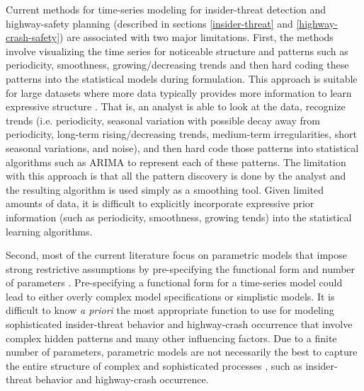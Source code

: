 \documentclass[letterpaper]{article}
\begin{document}
Current methods for time-series modeling for insider-threat detection and highway-safety planning (described in sections \ref{insider-threat} and \ref{highway-crash-safety}) are associated with two major limitations.  First, the methods involve visualizing the time series for noticeable structure and patterns such as periodicity, smoothness, growing/decreasing trends and then hard coding these patterns into the statistical models during formulation. This approach is suitable for large datasets where more data typically provides more information to learn expressive structure \citep{wilson2014covariance}. That is, an analyst is able to look at the data, recognize trends (i.e. periodicity, seasonal variation with possible decay away from periodicity, long-term rising/decreasing trends, medium-term irregularities, short seasonal variations, and noise), and then hard code those patterns into statistical algorithms such as ARIMA to represent each of these patterns. The limitation with this approach is that all the pattern discovery is done by the analyst and the resulting algorithm is used simply as a smoothing tool. Given limited amounts of data, it is difficult to explicitly incorporate expressive prior information (such as periodicity, smoothness, growing tends) into the statistical learning algorithms. 

Second, most of the current literature focus on parametric models that impose strong restrictive assumptions by pre-specifying the functional form and number of parameters \citep{veeramisti2016business,gheyas2016detection}. Pre-specifying a functional form for a time-series model could lead to either overly complex model specifications or simplistic models. It is difficult to know \textit{a priori} the most appropriate function to use for modeling sophisticated insider-threat behavior and highway-crash occurrence that involve complex hidden patterns and many other influencing factors. Due to a finite number of parameters, parametric models are not necessarily the best to capture the entire structure of complex and sophisticated processes \citep{ghahramani2015probabilistic}, such as insider-threat behavior and highway-crash occurrence. 
\end{document}

